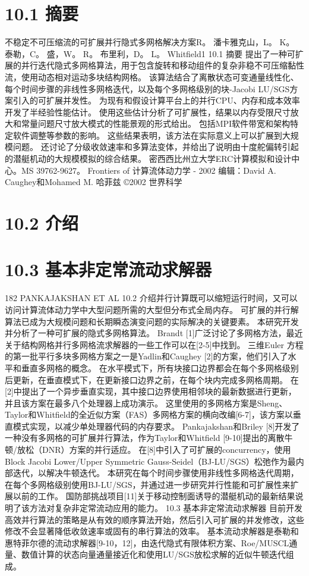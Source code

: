 \documentclass[UTF8,11pt,a4paper,openany,fontset=fandol]{ctexbook}
\begin{document}
\section{10.1 摘要}
不稳定不可压缩流的可扩展并行隐式多网格解决方案R。 潘卡雅克山，L。 K。 泰勒，C。 盛，W。 R。 布里利，D。 L。 Whitfield1 10.1 摘要 提出了一种可扩展的并行迭代隐式多网格算法，用于包含旋转和移动组件的复杂非稳不可压缩黏性流，使用动态相对运动多块结构网格。 该算法结合了离散状态可变通量线性化、每个时间步骤的非线性多网格迭代，以及每个多网格级别的块-Jacobi LU/SGS方案引入的可扩展并发性。 为现有和假设计算平台上的并行CPU、内存和成本效率开发了半经验性能估计。 使用这些估计分析了可扩展性，结果以内存受限尺寸放大和常量问题尺寸放大模式的性能景观的形式给出。 包括MPI软件带宽和架构特定软件调整等参数的影响。 这些结果表明，该方法在实际意义上可以扩展到大规模问题。 还讨论了分级收敛速率和多算法变体，并给出了说明由十度舵偏转引起的潜艇机动的大规模模拟的综合结果。 密西西比州立大学ERC计算模拟和设计中心。MS 39762-9627。 Frontiers of 计算流体动力学 - 2002 编辑：David A. Caughey和Mohamed M. 哈菲兹 ©2002 世界科学

\section{10.2 介绍}
\section{10.3 基本非定常流动求解器}
182 PANKAJAKSHAN ET AL 10.2 介绍并行计算既可以缩短运行时间，又可以访问计算流体动力学中大型问题所需的大型但分布式全局内存。 可扩展的并行解算法已成为大规模问题和长期瞬态演变问题的实际解决的关键要素。 本研究开发并分析了一种可扩展的隐式多网格算法。 Brandt [1]广泛讨论了多网格方法，最近关于结构网格并行多网格流求解器的一些工作可以在[2-5]中找到。 三维Euler 方程的第一批平行多块多网格方案之一是Yadlin和Caughey [2]的方案，他们引入了水平和垂直多网格的概念。 在水平模式下，所有块接口边界都会在每个多网格级别后更新，在垂直模式下，在更新接口边界之前，在每个块内完成多网格周期。 在[2]中提出了一个异步垂直实现，其中接口边界使用相邻块的最新数据进行更新，并且该方案在最多八个处理器上成功演示。 这里使用的多网格方案是Sheng、Taylor和Whitfield的全近似方案（FAS）多网格方案的横向改编[6-7]，该方案以垂直模式实现，以减少单处理器代码的内存要求。 Pankajakshan和Briley [8]开发了一种没有多网格的可扩展并行算法，作为Taylor和Whitfield [9-10]提出的离散牛顿/放松（DNR）方案的并行适应。 在[8]中引入了可扩展的concurrency，使用Block Jacobi Lower/Upper Symmetric Gauss-Seidel（BJ-LU/SGS）松弛作为最内部迭代，以解决牛顿迭代。 本研究在每个时间步骤使用非线性多网格迭代周期，在每个多网格级别使用BJ-LU/SGS，并通过进一步研究并行性能和可扩展性来扩展以前的工作。 国防部挑战项目[11]关于移动控制面诱导的潜艇机动的最新结果说明了该方法对复杂非定常流动应用的能力。 10.3 基本非定常流动求解器 目前开发高效并行算法的策略是从有效的顺序算法开始，然后引入可扩展的并发修改，这些修改不会显著降低收敛速率或固有的串行算法的效率。 基本流动求解器是泰勒和惠特菲尔德的流动求解器[9-10，12]，由迭代隐式有限体积方案、Roe/MUSCL通量、数值计算的状态向量通量接近化和使用LU/SGS放松求解的近似牛顿迭代组成。
\end{document}
